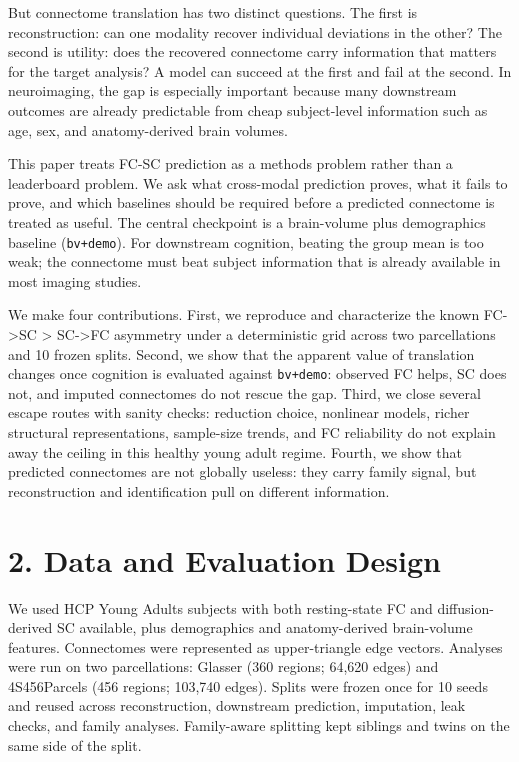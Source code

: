 But connectome translation has two distinct questions. The first is reconstruction: can one modality recover individual deviations in the other? The second is utility: does the recovered connectome carry information that matters for the target analysis? A model can succeed at the first and fail at the second. In neuroimaging, the gap is especially important because many downstream outcomes are already predictable from cheap subject-level information such as age, sex, and anatomy-derived brain volumes.

This paper treats FC-SC prediction as a methods problem rather than a leaderboard problem. We ask what cross-modal prediction proves, what it fails to prove, and which baselines should be required before a predicted connectome is treated as useful. The central checkpoint is a brain-volume plus demographics baseline (\texttt{bv+demo}). For downstream cognition, beating the group mean is too weak; the connectome must beat subject information that is already available in most imaging studies.

We make four contributions. First, we reproduce and characterize the known FC-\textgreater SC \textgreater{} SC-\textgreater FC asymmetry under a deterministic grid across two parcellations and 10 frozen splits. Second, we show that the apparent value of translation changes once cognition is evaluated against \texttt{bv+demo}: observed FC helps, SC does not, and imputed connectomes do not rescue the gap. Third, we close several escape routes with sanity checks: reduction choice, nonlinear models, richer structural representations, sample-size trends, and FC reliability do not explain away the ceiling in this healthy young adult regime. Fourth, we show that predicted connectomes are not globally useless: they carry family signal, but reconstruction and identification pull on different information.

\section{2. Data and Evaluation Design}\label{2-data-and-evaluation-design}

We used HCP Young Adults subjects with both resting-state FC and diffusion-derived SC available, plus demographics and anatomy-derived brain-volume features. Connectomes were represented as upper-triangle edge vectors. Analyses were run on two parcellations: Glasser (360 regions; 64,620 edges) and 4S456Parcels (456 regions; 103,740 edges). Splits were frozen once for 10 seeds and reused across reconstruction, downstream prediction, imputation, leak checks, and family analyses. Family-aware splitting kept siblings and twins on the same side of the split.

